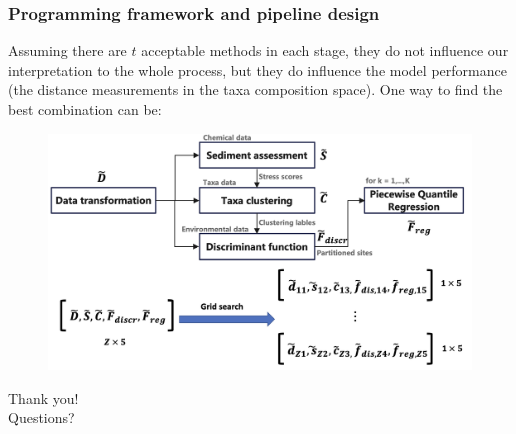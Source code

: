 \documentclass{beamer}
\begin{document}
\begin{frame}
\frametitle{Programming framework and pipeline design}

Assuming there are \(t\) acceptable methods in each stage, they do not influence our 
interpretation to the whole process, but they do influence the model performance 
(the distance measurements in the taxa composition space).
One way to find the best combination can be:

\begin{figure}
\centering
\includegraphics[width=\textwidth]{figures/p22_programing_pipeline.png}
\end{figure}

\end{frame}

\begin{frame}
\centering
\huge{Thank you!\\[1em]Questions?}
\end{frame}
\end{document}
